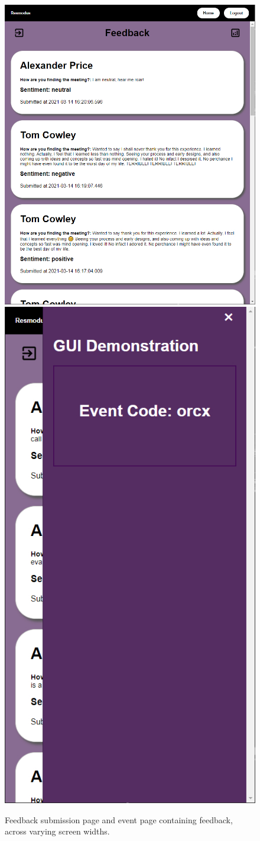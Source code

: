 \documentclass[9pt, titlepage]{extarticle}
\begin{document}
\begin{figure}[H]
    \centering
  \includegraphics[width=.6\linewidth]{images/event_full_thin1.jpg}\hfill
  \includegraphics[width=.36\linewidth]{images/event_full_thin2.jpg}\hfill
  \caption{Feedback submission page and event page containing feedback, across varying screen widths.}
  \label{fig:gui3}
 \end{figure}
\end{document}
